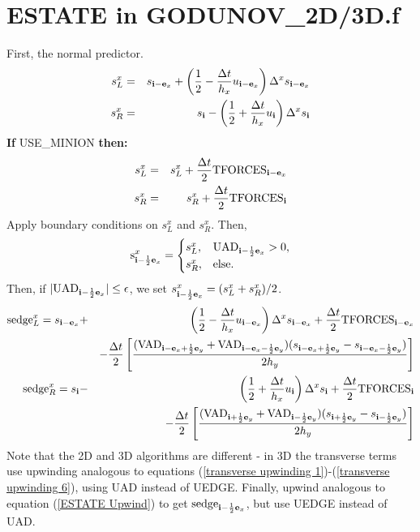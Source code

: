 \newpage

\section{ESTATE in GODUNOV\_2D/3D.f}
First, the normal predictor.
\begin{eqnarray}
s_L^x &=& s_{{\bf i}-{\bf e}_x} + \left(\frac{1}{2} - \frac{\Delta t}{h_x}u_{{\bf i}-{\bf e}_x}\right)\Delta^x s_{{\bf i}-{\bf e}_x} \\
s_R^x &=& s_{{\bf i}} - \left(\frac{1}{2} + \frac{\Delta t}{h_x}u_{{\bf i}}\right)\Delta^x s_{{\bf i}}
\end{eqnarray}
{\bf If} USE\_MINION {\bf then:}
\begin{eqnarray}
s_L^x &=& s_L^x + \frac{\Delta t}{2}\text{TFORCES}_{{\bf i}-{\bf e}_x} \\
s_R^x &=& s_R^x + \frac{\Delta t}{2}\text{TFORCES}_{{\bf i}}
\end{eqnarray}
Apply boundary conditions on $s_L^x$ and $s_R^x$.  Then,
\begin{equation}
\text{s}_{{\bf i}-\frac{1}{2}{\bf e}_x}^x =
\begin{cases}
s_L^x, & \text{UAD}_{{\bf i}-\frac{1}{2}{\bf e}_x} > 0, \\
s_R^x, & \text{else}. \\
\end{cases}\label{ESTATE Upwind}
\end{equation}
Then, if $|\text{UAD}_{{\bf i}-\frac{1}{2}{\bf e}_x}| \le \epsilon$, we set $s_{{\bf i}-\frac{1}{2}{\bf e}_x}^x = (s_L^x+s_R^x)/2$.
\begin{eqnarray}
\text{sedge}_L^x = s_{{\bf i}-{\bf e}_x} &+& \left(\frac{1}{2} - \frac{\Delta t}{h_x}u_{{\bf i}-{\bf e}_x}\right)\Delta^x s_{{\bf i}-{\bf e}_x} + \frac{\Delta t}{2}\text{TFORCES}_{{\bf i}-{\bf e}_x} \nonumber\\
&& - \frac{\Delta t}{2}\left[\frac{(\text{VAD}_{{\bf i}-{\bf e}_x+\frac{1}{2}{\bf e}_y}+\text{VAD}_{{\bf i}-{\bf e}_x-\frac{1}{2}{\bf e}_y})(s_{{\bf i}-{\bf e}_x+\frac{1}{2}{\bf e}_y}-s_{{\bf i}-{\bf e}_x-\frac{1}{2}{\bf e}_y})}{2h_y}\right] \\
\text{sedge}_R^x = s_{{\bf i}} &-& \left(\frac{1}{2} + \frac{\Delta t}{h_x}u_{{\bf i}}\right)\Delta^x s_{{\bf i}} + \frac{\Delta t}{2}\text{TFORCES}_{{\bf i}} \nonumber\\
&& - \frac{\Delta t}{2}\left[\frac{(\text{VAD}_{{\bf i}+\frac{1}{2}{\bf e}_y}+\text{VAD}_{{\bf i}-\frac{1}{2}{\bf e}_y})(s_{{\bf i}+\frac{1}{2}{\bf e}_y}-s_{{\bf i}-\frac{1}{2}{\bf e}_y})}{2h_y}\right]
\end{eqnarray}
Note that the 2D and 3D algorithms are different - in 3D the transverse 
terms use upwinding analogous to equations 
(\ref{transverse upwinding 1})-(\ref{transverse upwinding 6}), using UAD 
instead of UEDGE.  Finally, upwind analogous to equation (\ref{ESTATE Upwind}) 
to get $\text{sedge}_{{\bf i}-\frac{1}{2}{\bf e}_x}$, but use UEDGE instead of UAD.

